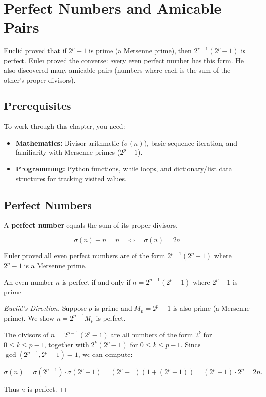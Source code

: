 
\chapter{Perfect Numbers and Amicable Pairs}

\begin{historical}
Euclid proved that if $2^p - 1$ is prime (a Mersenne prime), then $2^{p-1}(2^p - 1)$ is perfect.
Euler proved the converse: every even perfect number has this form. He also discovered
many amicable pairs (numbers where each is the sum of the other's proper divisors).
\end{historical}

\section{Prerequisites}

To work through this chapter, you need:
\begin{itemize}
    \item \textbf{Mathematics:} Divisor arithmetic ($\sigma(n)$), basic sequence iteration, and familiarity with Mersenne primes ($2^p - 1$).
    \item \textbf{Programming:} Python functions, while loops, and dictionary/list data structures for tracking visited values.
\end{itemize}

\section{Perfect Numbers}

A \textbf{perfect number} equals the sum of its proper divisors.

\[
\sigma(n) - n = n \quad \iff \quad \sigma(n) = 2n
\]

Euler proved all even perfect numbers are of the form $2^{p-1}(2^p - 1)$ where $2^p - 1$ is a Mersenne prime.

\begin{theorem}
An even number $n$ is perfect if and only if $n = 2^{p-1}(2^p - 1)$ where $2^p - 1$ is prime.
\end{theorem}

\begin{proof}[Euclid's Direction]
Suppose $p$ is prime and $M_p = 2^p - 1$ is also prime (a Mersenne prime). We show $n = 2^{p-1} M_p$ is perfect.

The divisors of $n = 2^{p-1}(2^p - 1)$ are all numbers of the form $2^k$ for $0 \le k \le p-1$, together with $2^k(2^p - 1)$ for $0 \le k \le p-1$. Since $\gcd(2^{p-1}, 2^p - 1) = 1$, we can compute:

\[
\sigma(n) = \sigma(2^{p-1}) \cdot \sigma(2^p - 1) = (2^p - 1)(1 + (2^p - 1)) = (2^p - 1) \cdot 2^p = 2n.
\]

Thus $n$ is perfect.
\end{proof}

